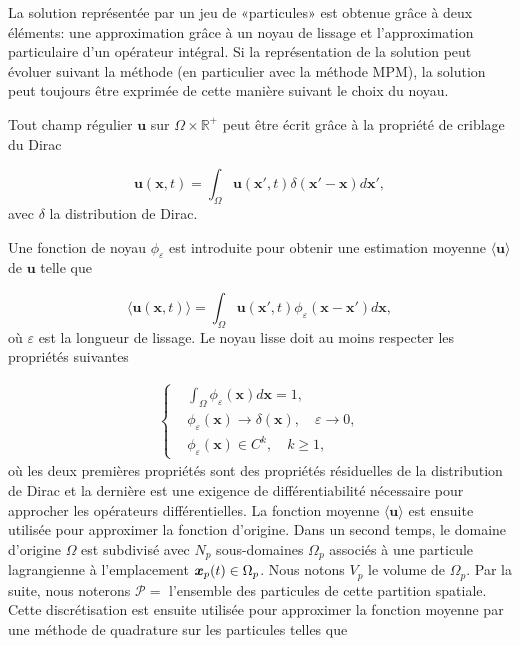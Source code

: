 La solution représentée par un jeu de «particules» est obtenue grâce à deux éléments: une approximation grâce à un noyau de lissage et l'approximation particulaire d'un opérateur intégral. Si la représentation de la solution peut évoluer suivant la méthode (en particulier avec la méthode MPM), la solution peut toujours être exprimée de cette manière suivant le choix du noyau.

Tout champ régulier $\bm{u}$ sur $\Omega \times \mathbb R^+$ peut être écrit grâce à la propriété de criblage du Dirac

\begin{equation*}
    \bm{u}(\bm{x}, t) = \int_{\Omega} \bm{u}(\bm{x}', t) \delta(\bm{x}' - \bm{x})  d\bm{x}',
\end{equation*}avec $\delta$ la distribution de Dirac.

Une fonction de noyau $\phi_\varepsilon$ est introduite pour obtenir une estimation moyenne $\langle \bm{u} \rangle$ de $\bm{u}$ telle que

\begin{equation*}
    \langle \bm{u}(\bm{x}, t) \rangle = \int_{\Omega} \bm{u}(\bm{x}', t) \phi_\varepsilon(\bm{x}-\bm{x}') d\bm{x},
\end{equation*}où $\varepsilon$ est la longueur de lissage. Le noyau lisse doit au moins respecter les propriétés suivantes

\begin{gather*}
    \left\{\begin{aligned}
         & \int_{\Omega} \phi_\varepsilon(\bm{x}) d\bm{x} = 1,                  \\
         & \phi_\varepsilon(\bm{x}) \to \delta(\bm x), \quad \varepsilon \to 0, \\
         & \phi_\varepsilon(\bm{x}) \in C^k,  \quad k \geq 1,
    \end{aligned} \right.
\end{gather*}où les deux premières propriétés sont des propriétés résiduelles de la distribution de Dirac et la dernière est une exigence de différentiabilité nécessaire pour approcher les opérateurs différentielles. La fonction moyenne $\langle \bm{u} \rangle$ est ensuite utilisée pour approximer la fonction d'origine. Dans un second temps, le domaine d'origine $\Omega$ est subdivisé avec $N_p$ sous-domaines $\Omega_p$ associés à une particule lagrangienne à l'emplacement $\bm{x}_p(t) \in \Omega_p$. Nous notons $V_p$ le volume de $\Omega_p$. Par la suite, nous noterons $\mathcal P = $ l'ensemble des particules de cette partition spatiale. Cette discrétisation est ensuite utilisée pour approximer la fonction moyenne par une méthode de quadrature sur les particules telles que

